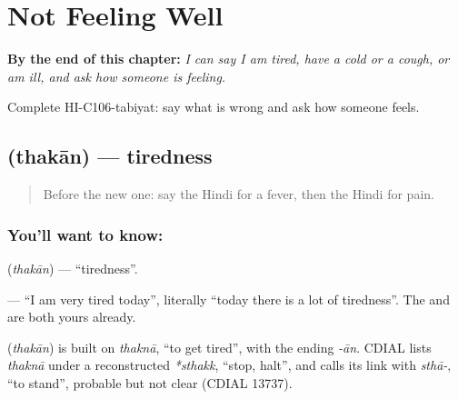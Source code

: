 
\chapter{Not Feeling Well}
\label{ch:hi-not-feeling-well}

\begin{chapteropening}
\textbf{By the end of this chapter:} \emph{I can say I am tired, have a cold or a cough, or am ill, and ask how someone is feeling.}

Complete HI-C106-tabiyat: say what is wrong and ask how someone feels.
\end{chapteropening}

\section[\texorpdfstring{\hi{थकान} (thakān)}{थकान (thakān)}]{ (thakān) — tiredness}

\label{lesson:HI-C106-thakan}



\begin{quote}
Before the new one: say the Hindi for a fever, then the Hindi for pain.
\end{quote}

\subsection*{You'll want to know: }
\textbf{} (\emph{thakān}) — \textquotedblleft{}tiredness\textquotedblright{}.

\textbf{   } — \textquotedblleft{}I am very tired today\textquotedblright{}, literally \textquotedblleft{}today there is a lot of tiredness\textquotedblright{}. The \textbf{} and \textbf{} are both yours already.

\begin{cousinweb}
\textbf{} (\emph{thakān}) is built on \emph{thaknā}, \textquotedblleft{}to get tired\textquotedblright{}, with the ending \emph{-ān}. CDIAL lists \emph{thaknā} under a reconstructed \emph{*sthakk}, \textquotedblleft{}stop, halt\textquotedblright{}, and calls its link with \emph{sthā-}, \textquotedblleft{}to stand\textquotedblright{}, probable but not clear (CDIAL 13737).
\end{cousinweb}

